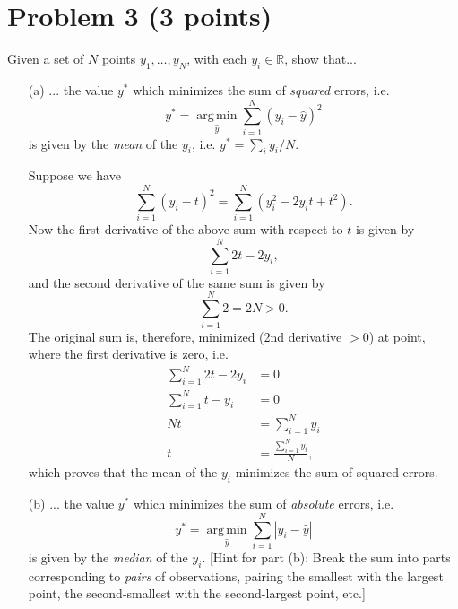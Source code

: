 \documentclass[10pt]{article}
\DeclareMathOperator*{\argmin}{arg\, min}
\begin{document}
\color{blue}
\section*{Problem 3 (3 points)}
Given a set of $N$ points $y_1, \dots, y_N$, with each $y_i \in \mathbb{R}$, show that...
\begin{itemize}
  \item[(a)] ... the value $y^{\ast}$ which minimizes the sum of \textit{squared} errors, i.e.
 \[
 y^{\ast} = \underset{\hat{y}}{\argmin} \sum_{i = 1}^N (y_i - \hat{y})^2
 \]
 is given by the \textit{mean} of the $y_i$, i.e. $y^\ast = \sum_i y_i / N$.
 
 \color{black} 
 Suppose we have 
 \[
 \sum_{i = 1}^N (y_i - t)^2 = \sum_{i = 1}^N (y_i^2 - 2y_it + t^2).
 \]
 Now the first derivative of the above sum with respect to $t$ is given by
 \[
 \sum_{i = 1}^N 2t - 2y_i,
 \]
 and the second derivative of the same sum is given by
 \[
 \sum_{i = 1}^N 2 = 2N > 0.
 \]
 The original sum is, therefore, minimized (2nd derivative $> 0$) at point, where the first derivative is zero, i.e.
 \begin{align*}
 \sum_{i = 1}^N 2t - 2y_i &= 0 \\
 \sum_{i = 1}^N t - y_i &= 0 \\
 Nt &= \sum_{i = 1}^N y_i \\
 t &= \frac{\sum_{i = 1}^N y_i}{N},
 \end{align*}
 which proves that the mean of the $y_i$ minimizes the sum of squared errors.
 
 \color{blue}
 \item[(b)] ... the value $y^{\ast}$ which minimizes the sum of \textit{absolute} errors, i.e.
 \[
 y^\ast = \underset{\hat{y}}{\argmin} \sum_{i = 1}^N |y_i - \hat{y}|
 \] 
 is given by the \textit{median} of the $y_i$. [Hint for part (b): Break the sum into parts corresponding to \textit{pairs} of observations, pairing the smallest with the largest point, the second-smallest with the second-largest point, etc.]
 

\end{itemize}
\end{document}
